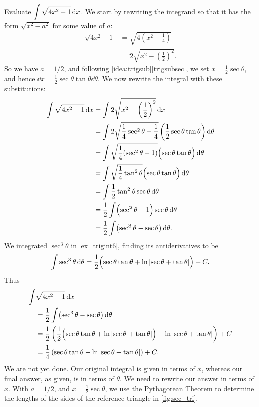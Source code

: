 \begin{example}\label{ex_trigsub2}%
Evaluate $\displaystyle \int \sqrt{4x^2-1}\operatorname{d}\! x$.
\solution
We start by rewriting the integrand so that it has the form $\sqrt{x^2-a^2}$ for some value of $a$:
\begin{align*}
\sqrt{4x^2-1} &= \sqrt{4\left(x^2-\frac14\right)}\\
		&= 2\sqrt{x^2-\left(\frac12\right)^2}.
\end{align*}
So we have $a=1/2$, and following \autoref{idea:trigsub}\ref*{trigsubsec}, we set $x= \frac12\sec\theta$, and hence $\dd x = \frac12\sec\theta\tan\theta\dd\theta$. %
We now rewrite the integral with these substitutions:\vspace{-.3\baselineskip}
\begin{align*}
	\int \sqrt{4x^2-1}\dd x &= \int 2\sqrt{x^2-\left(\frac12\right)^2}\dd x\\
	&= \int 2\sqrt{\frac14\sec^2\theta - \frac14}
	\left(\frac12\sec\theta\tan\theta\right)\dd\theta\\
	&=\int \sqrt{\frac14(\sec^2\theta-1)}\Bigl(\sec\theta\tan\theta\Bigr)\dd\theta\\
	&=\int\sqrt{\frac14\tan^2\theta}\Bigl(\sec\theta\tan\theta\Bigr)\dd\theta\\
	&=\int \frac12\tan^2\theta\sec\theta\dd\theta\\
	&=\frac12\int \Bigl(\sec^2\theta-1\Bigr)\sec\theta\dd\theta\\
	&=\frac12\int \bigl(\sec^3\theta - \sec\theta\bigr)\dd\theta.
\end{align*}
We integrated $\sec^3\theta$ in \autoref{ex_trigint6}, finding its antiderivatives to be
\[
\int\sec^3\theta\operatorname{d}\!\theta
=\frac12\Bigl(\sec\theta\tan\theta+\ln\left\lvert \sec\theta+\tan\theta \right\rvert\Bigr)+C.
\]
Thus
\begin{align*}
\int &\sqrt{4x^2-1}\operatorname{d}\! x\\
	&=\frac12\int \bigl(\sec^3\theta-\sec\theta\bigr)\operatorname{d}\!\theta\\
	&= \frac12\left(\frac12\Bigl(\sec\theta\tan\theta
	+\ln\left\lvert \sec\theta+\tan \theta \right\rvert\Bigr)-\ln\left\lvert \sec\theta+\tan\theta \right\rvert\right) + C\\
	&= \frac14\left(\sec\theta\tan\theta -\ln\left\lvert \sec\theta+\tan\theta \right\rvert\right)+C.
\end{align*}
We are not yet done. Our original integral is given in terms of $x$, whereas our final answer, as given, is in terms of $\theta$. We need to rewrite our answer in terms of $x$. With $a=1/2$, and $x=\frac12\sec\theta$, we use the Pythagorean Theorem to determine the lengths of the sides of the reference triangle in \autoref{fig:sec_tri}.

\end{example}
